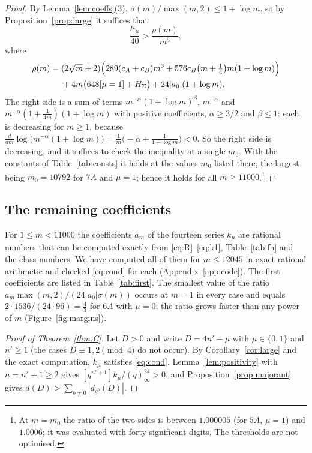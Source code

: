 \documentclass[11pt]{amsart}
\theoremstyle{definition}
\begin{document}
\begin{proof}
By Lemma~\ref{lem:coeffs}(3), $\sigma(m)/\max(m,2)\le1+\log m$, so by Proposition~\ref{prop:large} it suffices that
\[
\frac{\mu_\mu}{40}>\frac{\rho(m)}{m^5},
\]
where
\begin{align*}
\rho(m)={}&(2\sqrt m+2)\Bigl(289(c_A+c_B)m^3+576c_B\bigl(m+\tfrac14\bigr)m(1+\log m)\Bigr)\\
&+4m\bigl(648[\mu=1]+H_\Sigma\bigr)+24|a_0|(1+\log m).
\end{align*}
The right side is a sum of terms $m^{-\alpha}(1+\log m)^\beta$, $m^{-\alpha}$ and $m^{-\alpha}(1+\frac1{4m})(1+\log m)$ with positive coefficients, $\alpha\ge3/2$ and $\beta\le1$; each is decreasing for $m\ge1$, because $\frac{d}{dm}\log\bigl(m^{-\alpha}(1+\log m)\bigr)=\frac1m\bigl(-\alpha+\frac1{1+\log m}\bigr)<0$. So the right side is decreasing, and it suffices to check the inequality at a single $m_0$. With the constants of Table~\ref{tab:consts} it holds at the values $m_0$ listed there, the largest being $m_0=10792$ for $7A$ and $\mu=1$; hence it holds for all $m\ge11000$.\footnote{At $m=m_0$ the ratio of the two sides is between $1.000005$ (for $5A$, $\mu=1$) and $1.0006$; it was evaluated with forty significant digits. The thresholds are not optimised.}
\end{proof}

\subsection{The remaining coefficients}
For $1\le m<11000$ the coefficients $a_m$ of the fourteen series $k_\mu$ are rational numbers that can be computed exactly from \eqref{eq:R}--\eqref{eq:k1}, Table~\ref{tab:fh} and the class numbers. We have computed all of them for $m\le12045$ in exact rational arithmetic and checked \eqref{eq:cond} for each (Appendix~\ref{app:code}). The first coefficients are listed in Table~\ref{tab:first}. The smallest value of the ratio $a_m\max(m,2)/(24|a_0|\sigma(m))$ occurs at $m=1$ in every case and equals $2\cdot1536/(24\cdot96)=\frac43$ for $6A$ with $\mu=0$; the ratio grows faster than any power of $m$ (Figure~\ref{fig:margins}).

\begin{proof}[Proof of Theorem~\ref{thm:C}]
Let $D>0$ and write $D=4n'-\mu$ with $\mu\in\{0,1\}$ and $n'\ge1$ (the cases $D\equiv1,2\pmod 4$ do not occur). By Corollary~\ref{cor:large} and the exact computation, $k_\mu$ satisfies \eqref{eq:cond}. Lemma~\ref{lem:positivity} with $n=n'+1\ge2$ gives $[q^{n'+1}]k_\mu/(q)_\infty^{24}>0$, and Proposition~\ref{prop:majorant} gives $d(D)>\sum_{b\ne0}|d_{g^b}(D)|$.
\end{proof}
\end{document}
